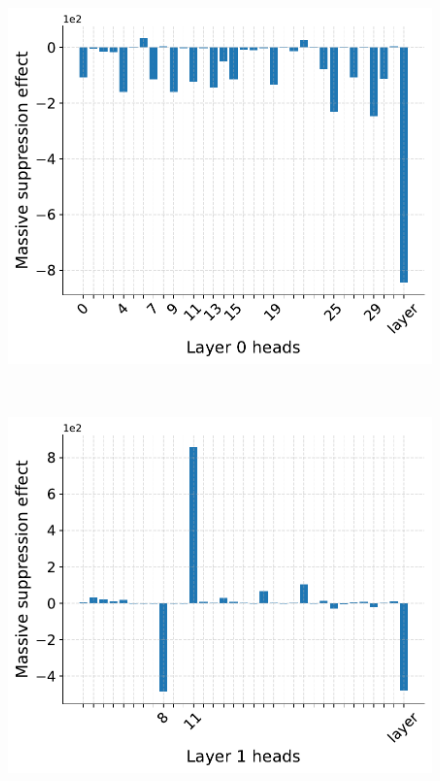 \begin{figure}[t]
  \centering
  \begin{minipage}{0.33\textwidth}
      \centering
      \label{fig:appendix-ablation-massive-sup-control-0}
      \vspace{-.2em}
      \includegraphics[width=\linewidth]{Figures/figures_circuit/interventions/bos_control/bos_massive_sup_L0.pdf}
  \end{minipage}~
  \begin{minipage}{0.33\textwidth}
      \centering
      \label{fig:appendix-ablation-massive-sup-control-1}
      \vspace{-.2em}
      \includegraphics[width=\linewidth]{Figures/figures_circuit/interventions/bos_control/bos_massive_sup_L1.pdf}

\end{minipage}
\end{figure}
